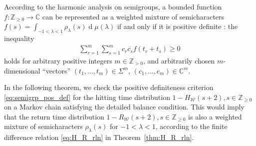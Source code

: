 \documentclass[10pt,journal,compsoc]{IEEEtran}
\DeclareMathOperator{\D}{d}
\begin{document}
 According to the harmonic analysis on semigroups, a bounded function $ f:\mathbb Z_{\geq0}\longrightarrow \mathbb C$ can be represented as a weighted mixture of semi\-characters $ f(s)=\int _{-1<\lambda<1}\rho_{\lambda}(s)\D\mu(\lambda)$ if and only if it is positive definite   \cite[p.~93, Theorem 2.5]{GTM100}:
the inequality \begin{align}
\sum_{r=1}^m\sum_{s=1}^mc_r\overline{c_s}f(t_r+t_s)\geq0\label{eq:semigrp_pos_def}
\end{align}holds for arbitrary positive integers $m\in\mathbb Z_{>0}$, and arbitrarily chosen $m$-dimensional ``vectors'' $(t_1,\dots,t_m)\in\Sigma^m $, $ (c_1,\dots,c_m)\in\mathbb C^m$.

In the following theorem, we  check the positive definiteness criterion \eqref{eq:semigrp_pos_def} for the   hitting time distribution $ 1-H_{\mathscr W}(s+2),s\in\mathbb Z_{\geq0}$ on a Markov chain satisfying the detailed balance condition. This would imply that the return time distribution $ 1-R_{\mathscr W}(s+2),s\in\mathbb Z_{\geq0}$  is also a weighted mixture of semicharacters $ \rho_\lambda(s)$ for $ -1<\lambda<1$, according to the finite difference relation \eqref{eq:H_R_rln} in Theorem~\ref{thm:H_R_rln}.
\end{document}
